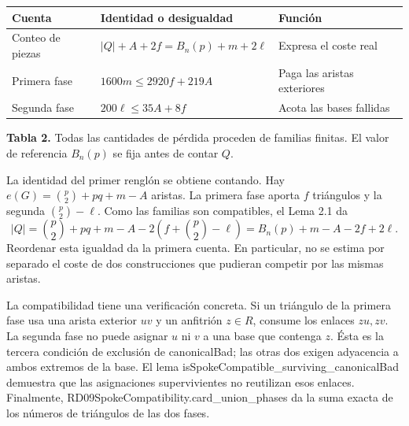 \documentclass[spanish,11pt,a4paper]{article}
\newcounter{none}
\begin{document}

{\def\LTcaptype{none} %
\begin{longtable}[c]{@{}
  >{\raggedright\arraybackslash}p{}
  >{\raggedright\arraybackslash}p{}
  >{\raggedright\arraybackslash}p{}@{}}
\toprule\noalign{}
\begin{minipage}[b]{\linewidth}\raggedright
Cuenta
\end{minipage} & \begin{minipage}[b]{\linewidth}\raggedright
Identidad o desigualdad
\end{minipage} & \begin{minipage}[b]{\linewidth}\raggedright
Función
\end{minipage} \\
\midrule\noalign{}
\endhead
\bottomrule\noalign{}
\endlastfoot
Conteo de piezas & \(|Q|+A+2f=B_n(p)+m+2\ell\) & Expresa el coste real \\
Primera fase & \(1600m\le2920f+219A\) & Paga las aristas exteriores \\
Segunda fase & \(200\ell\le35A+8f\) & Acota las bases fallidas \\
\end{longtable}
}

\textbf{Tabla 2.} Todas las cantidades de pérdida proceden de familias finitas. El valor de referencia \(B_n(p)\) se fija antes de contar \(Q\).

La identidad del primer renglón se obtiene contando. Hay \(e(G)=\binom p2+pq+m-A\) aristas. La primera fase aporta \(f\) triángulos y la segunda \(\binom p2-\ell\). Como las familias son compatibles, el Lema 2.1 da \[
|Q|=\binom p2+pq+m-A-2\left(f+\binom p2-\ell\right)
=B_n(p)+m-A-2f+2\ell.
\tag{5.4a}
\] Reordenar esta igualdad da la primera cuenta. En particular, no se estima por separado el coste de dos construcciones que pudieran competir por las mismas aristas.

La compatibilidad tiene una verificación concreta. Si un triángulo de la primera fase usa una arista exterior \(uv\) y un anfitrión \(z\in R\), consume los enlaces \(zu,zv\). La segunda fase no puede asignar \(u\) ni \(v\) a una base que contenga \(z\). Ésta es la tercera condición de exclusión de {\ttfamily\small canonicalBad}; las otras dos exigen adyacencia a ambos extremos de la base. El lema {\ttfamily\small isSpokeCompa\discretionary{\hbox{\ensuremath{\hookrightarrow}}}{}{}tible\_\discretionary{\hbox{\ensuremath{\hookrightarrow}}}{}{}surviving\_\discretionary{\hbox{\ensuremath{\hookrightarrow}}}{}{}canonicalBad} demuestra que las asignaciones supervivientes no reutilizan esos enlaces. Finalmente, {\ttfamily\small RD09SpokeCom\discretionary{\hbox{\ensuremath{\hookrightarrow}}}{}{}patibility.\discretionary{\hbox{\ensuremath{\hookrightarrow}}}{}{}card\_\discretionary{\hbox{\ensuremath{\hookrightarrow}}}{}{}union\_\discretionary{\hbox{\ensuremath{\hookrightarrow}}}{}{}phases} da la suma exacta de los números de triángulos de las dos fases.
\end{document}
